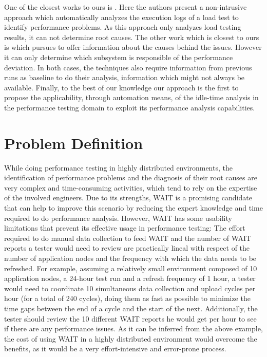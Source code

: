 \documentclass[runningheads,a4paper]{llncs}
\begin{document}
One of the closest works to ours is \cite{Jiang2009}. Here the authors present a
non-intrusive approach which automatically analyzes the execution logs of a load
test to identify performance problems. As this approach only analyzes load
testing results, it can not determine root causes. The other work which is
closest to ours is \cite{Malik1} which pursues to offer information about the
causes behind the issues. However it can only determine which subsystem is
responsible of the performance deviation. In both cases, the techniques
also require information from previous runs as baseline to do their analysis,
information which might not always be available. Finally, to the best of our knowledge our
approach is the first to propose the applicability, through automation means, of
the idle-time analysis in the performance testing domain to exploit its performance analysis capabilities.

\vspace{-5pt}
\section{Problem Definition}
\vspace{-5pt}
While doing performance testing in highly distributed environments, the
identification of performance problems and the diagnosis of their root causes
are very complex and time-consuming activities, which tend to rely on the
expertise of the involved engineers. Due to its strengths, WAIT is a promising
candidate that can help to improve this scenario by reducing the expert
knowledge and time required to do performance analysis. However, WAIT has some
usability limitations that prevent its effective usage in performance
testing: The effort required to do manual data collection to feed WAIT and the
number of WAIT reports a tester would need to review are practically lineal with
respect of the number of application nodes and the frequency with which the data
needs to be refreshed. For example, assuming a relatively small environment
composed of 10 application nodes, a 24-hour test run and a refresh frequency of
1 hour, a tester would need to coordinate 10 simultaneous data collection and
upload cycles per hour (for a total of 240 cycles), doing them as fast as
possible to minimize the time gaps between the end of a cycle and the start of the next.
Additionally, the tester should review the 10 different WAIT reports he would
get per hour to see if there are any performance issues. As it can be inferred
from the above example, the cost of using WAIT in a highly distributed
environment would overcome the benefits, as it would be a very effort-intensive
and error-prone process.
\end{document}
